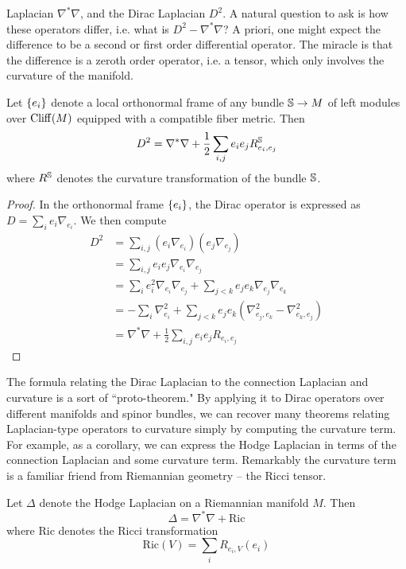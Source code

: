 Laplacian $\nabla^*\nabla$, and the Dirac Laplacian $D^2$. A natural question
to ask is how these operators differ, i.e. what is $D^2 - \nabla^*\nabla$? A priori,
one might expect the difference to be a second or first order differential operator.
The miracle is that the difference is a zeroth order operator, i.e. a tensor, which
only involves the curvature of the manifold.
%
\begin{thm}
Let $\set{e_i}$ denote a local orthonormal frame of any bundle $\S \to M$ of left
modules over $\Cliff(M)$ equipped with a compatible fiber metric. Then
\[
D^2 = \nabla^*\nabla + \frac{1}{2}\sum_{i, j} e_i e_j R^\S_{e_i, e_j}
\]
where $R^\S$ denotes the curvature transformation of the bundle $\S$.
\end{thm}
%
\begin{proof}
In the orthonormal frame $\set{e_i}$, the Dirac operator is expressed as
$D = \sum_i e_i\nabla_{e_i}$. We then compute
\begin{align*}
D^2 &= \sum_{i,j}(e_i\nabla_{e_i})(e_j\nabla_{e_j}) \\
&= \sum_{i,j} e_ie_j\nabla_{e_i}\nabla_{e_j} \\
&= \sum_i e_i^2\nabla_{e_i}\nabla_{e_j} + \sum_{j < k} e_j e_k\nabla_{e_j}\nabla_{e_k} \\
&= -\sum_i \nabla^2_{e_i}
+ \sum_{j < k} e_je_k (\nabla^2_{e_j, e_k} - \nabla^2_{e_k, e_j}) \\
&= \nabla^*\nabla + \frac{1}{2}\sum_{i, j} e_i e_j R_{e_i, e_j}
\end{align*}
\end{proof}
%
The formula relating the Dirac Laplacian to the connection Laplacian and curvature
is a sort of ``proto-theorem." By applying it to Dirac operators over different
manifolds and spinor bundles, we can recover many theorems relating Laplacian-type
operators to curvature simply by computing the curvature term. For example,
as a corollary, we can express the Hodge Laplacian in terms of the connection Laplacian
and some curvature term. Remarkably the curvature term is a familiar friend from
Riemannian geometry -- the Ricci tensor.
%
\begin{cor}
Let $\Delta$ denote the Hodge Laplacian on a Riemannian manifold $M$. Then
\[
\Delta = \nabla^*\nabla + \mathrm{Ric}
\]
where $\mathrm{Ric}$ denotes the Ricci transformation
\[
\mathrm{Ric}(V) = \sum_{i} R_{e_i,V}(e_i)
\]
\end{cor}
%
